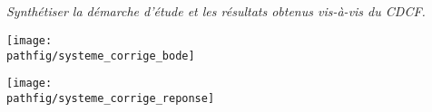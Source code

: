 \documentclass[10pt,fleqn]{article} %
\begin{document}
\begin{multicols}{2}


\subparagraph{}\textit{Synthétiser la démarche d'étude et les résultats obtenus vis-à-vis du CDCF.}






\begin{center}

\texttt{[image: \\pathfig/systeme\_corrige\_bode]}

\texttt{[image: \\pathfig/systeme\_corrige\_reponse]}

%
\end{center}


\end{multicols}
\end{document}
